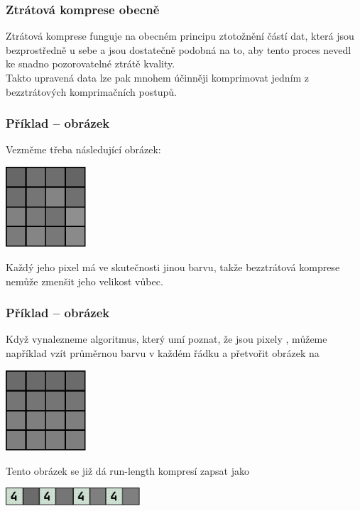 \documentclass[aspectratio=169,11pt,svgnames]{beamer}
\begin{document}
\begin{frame}
 \frametitle{Ztrátová komprese obecně}
 Ztrátová komprese funguje na obecném principu ztotožnění částí dat, která jsou
 bezprostředně u sebe a jsou dostatečně podobná na to, aby tento proces nevedl
 ke snadno pozorovatelné ztrátě kvality.\pause\\
 Takto upravená data lze pak mnohem účinněji komprimovat jedním z
 \alert{bezztrátových} komprimačních postupů.
\end{frame}

\begin{frame}
 \frametitle{Příklad -- obrázek}
 Vezměme třeba následující obrázek:
 \begin{center}
  \includegraphics[width=3cm]{lossy-1.pdf}
 \end{center}
 \pause
 Každý jeho pixel má ve skutečnosti jinou barvu, takže bezztrátová komprese
 nemůže zmenšit jeho velikost vůbec.
\end{frame}

\begin{frame}
 \frametitle{Příklad -- obrázek}
 Když vynalezneme algoritmus, který umí poznat, že jsou pixely , můžeme například vzít průměrnou barvu v každém řádku a přetvořit
 obrázek na
 \begin{center}
  \includegraphics[width=3cm]{lossy-2.pdf}
  \vspace*{-.5em}
 \end{center}
 \pause
 Tento obrázek se již dá run-length kompresí zapsat jako
 \begin{center}
  \includegraphics[width=5cm]{lossy-3.pdf}
  \vspace*{-.5em}
 \end{center}
\end{frame}
\end{document}
